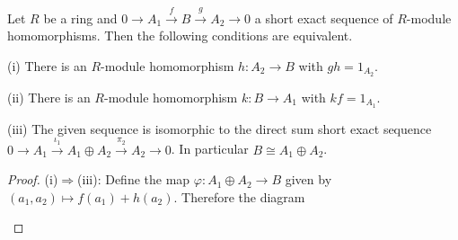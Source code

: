 \begin{theorem}
Let $R$ be a ring and $0\longrightarrow A_1\overset{f}{\longrightarrow}B\overset{g}{\longrightarrow}A_2\longrightarrow 0$ a short exact sequence of $R$-module homomorphisms. Then the following conditions are equivalent.\par
(i) There is an $R$-module homomorphism $h:A_2\to B$ with $gh=1_{A_2}$.\par
(ii) There is an $R$-module homomorphism $k:B\to A_1$ with $kf=1_{A_1}$.\par
(iii) The given sequence is isomorphic to the direct sum short exact sequence $0\longrightarrow A_1\overset{\iota _1}{\longrightarrow}A_1\oplus A_2\overset{\pi _2}{\longrightarrow}A_2\longrightarrow 0$. In particular $B\cong A_1\oplus A_2$.
\end{theorem}
\begin{proof}
(i)$\Rightarrow$(iii): Define the map $\varphi:A_1\oplus A_2\to B$ given by $(a_1,a_2)\mapsto f(a_1)+h(a_2)$. Therefore the diagram 
\begin{center}



\begin{tikzpicture}[x=0.75pt,y=0.75pt,yscale=-1,xscale=1]


\end{tikzpicture}
\end{center}
\end{proof}

